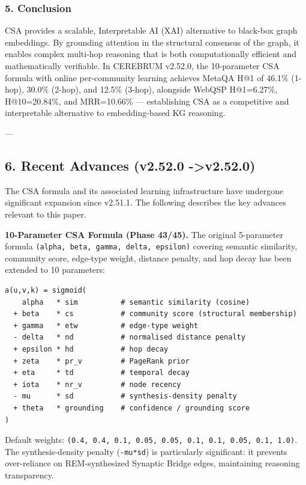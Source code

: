 \subsubsection{5. Conclusion}
CSA provides a scalable, Interp\-retable AI (XAI) alternative to black-box graph embeddings. By grounding attention in the structural consensus of the graph, it enables complex multi-hop reasoning that is both compu\-tationally efficient and mathe\-matically verifiable. In CEREBRUM v2.52.0, the 10-parameter CSA formula with online per-community learning achieves MetaQA H@1 of 46.1\% (1-hop), 30.0\% (2-hop), and 12.5\% (3-hop), alongside WebQSP H@1=6.27\%, H@10=20.84\%, and MRR=10.66\% — estab\-lishing CSA as a competitive and inter\-pretable alternative to embedding-based KG reasoning.

---

\subsection{6. Recent Advances (v2.52.0 -\textgreater  v2.52.0)}

The CSA formula and its associated learning infra\-structure have undergone significant expansion since v2.51.1. The following describes the key advances relevant to this paper.

\textbf{10-Parameter CSA Formula (Phase 43/45).} The original 5-parameter formula \texttt{(alpha, beta, gamma, delta, epsilon)} covering semantic similarity, community score, edge-type weight, distance penalty, and hop decay has been extended to 10 parameters:

\begin{lstlisting}
a(u,v,k) = sigmoid(
    alpha   * sim          # semantic similarity (cosine)
  + beta    * cs           # community score (structural membership)
  + gamma   * etw          # edge-type weight
  - delta   * nd           # normalised distance penalty
  + epsilon * hd           # hop decay
  + zeta    * pr_v         # PageRank prior
  + eta     * td           # temporal decay
  + iota    * nr_v         # node recency
  - mu      * sd           # synthesis-density penalty
  + theta   * grounding    # confidence / grounding score
)
\end{lstlisting}

Default weights: \texttt{(0.4, 0.4, 0.1, 0.05, 0.05, 0.1, 0.1, 0.05, 0.1, 1.0)}. The synthesis-density penalty (\texttt{-mu*sd}) is parti\-cularly significant: it prevents over-reliance on REM-synthesized Synaptic Bridge edges, maintaining reasoning trans\-parency.

